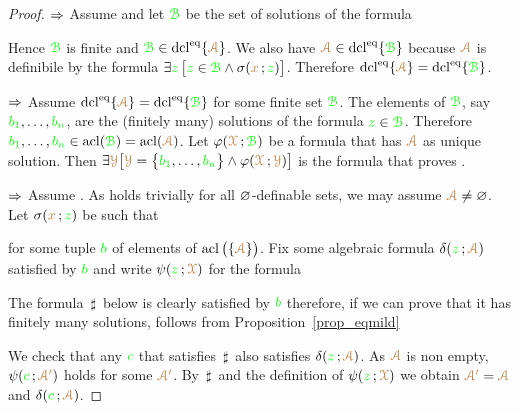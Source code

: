 \documentclass[creche.tex]{subfiles}
\begin{document}
\begin{proof}$\IMP$ Assume  and let ${\gr\B}$ be the set of solutions of the formula


Hence ${\gr\B}$ is finite and ${\gr\B}\in\dcl^\eq\{{\vl\Aa}\}$.
We also have ${\vl\Aa}\in\dcl^\eq\{{\gr\B}\}$ because ${\vl\Aa}$ is definibile by the formula $\E{\gr z}\,\big[{\gr z}\in {\gr\B}\wedge \sigma({\mr x}\,;{\gr z})\big]$.
Therefore $\dcl^\eq\{{\vl\Aa}\}=\dcl^\eq\{{\gr\B}\}$.



$\IMP$ Assume $\dcl^\eq\{{\vl\Aa}\}=\dcl^\eq\{{\gr\B}\}$ for some finite set ${\gr\B}$.
The elements of ${\gr\B}$, say ${\gr b_1},\dots,{\gr b_n}$, are the (finitely many) solutions of the formula ${\gr z}\in{\gr\B}$.
Therefore ${\gr b_1},\dots,{\gr b_n}\in\acl({\gr\B})=\acl({\vl\Aa})$.
Let $\phi({\vl\X}\,;{\gr\B})$ be a formula that has ${\vl\Aa}$ as unique solution.
Then $\E{\vl\Y} \big[{\vl\Y}=\big\{{\gr b_1},\dots,{\gr b_n}\big\}\wedge \phi({\vl\X}\,;{\vl\Y})\big]$ is the formula that proves .

$\IMP$ Assume .
As  holds trivially for all $\0$-definable sets, we may assume ${\vl\Aa}\neq\0$.
Let $\sigma({\mr x}\,;{\gr z})$ be such that


for some tuple ${\gr b}$ of elements of $\acl\big(\{{\vl\Aa}\}\big)$.
Fix some algebraic formula $\delta({\gr z}\,;{\vl\Aa})$ satisfied by  ${\gr b}$ and write $\psi({\gr z}\,;{\vl\X})$ for the formula


The formula $\,\sharp\,$ below is clearly satisfied by ${\gr b}$ therefore, if we can prove that it has finitely many solutions,  follows from Proposition~\ref{prop_eqmild}


We check that any ${\gr c}$ that satisfies $\,\sharp\,$ also satisfies $\delta({\gr z}\,;{\vl\Aa})$.
As ${\vl\Aa}$ is non empty, $\psi({\gr c}\,;{\vl\Aa'})$ holds for some ${\vl\Aa'}$.
By $\,\sharp\,$ and the definition of $\psi({\gr z}\,;{\vl\X})$ we obtain ${\vl\Aa'}={\vl\Aa}$ and  $\delta({\gr c}\,;{\vl\Aa})$.
\end{proof}
\end{document}
